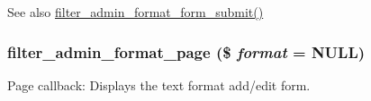 \begin{DoxySeeAlso}{See also}
\hyperlink{filter_8admin_8inc_a1cabbcac9ccc4de52ea16a64a8c8cd54}{filter\_\-admin\_\-format\_\-form\_\-submit()} 
\end{DoxySeeAlso}
\hypertarget{filter_8admin_8inc_aad02098c7cd9b370e0692fb74f498706}{
\subsubsection[{filter\_\-admin\_\-format\_\-page}]{\setlength{\rightskip}{0pt plus 5cm}filter\_\-admin\_\-format\_\-page (\$ {\em format} = {\ttfamily NULL})}}
\label{filter_8admin_8inc_aad02098c7cd9b370e0692fb74f498706}
Page callback: Displays the text format add/edit form.


